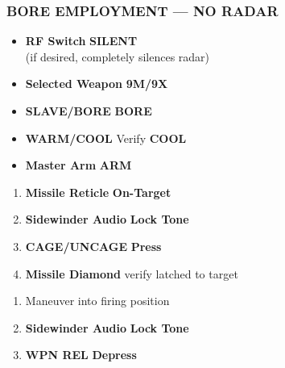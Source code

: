 \subsubsection{BORE EMPLOYMENT --- NO RADAR}
\label{subsec:aim9:bore}
\begin{checklistenumerate}
    \blueitem[Prerequisites]
    \begin{itemize}
        \item \textbf{RF Switch} \dotfill \textbf{SILENT} \\
        \hfill (if desired, completely silences radar)
        \item \textbf{Selected Weapon} \dotfill \textbf{9M/9X}
        \item \textbf{SLAVE/BORE} \dotfill \textbf{BORE}
        \item \textbf{WARM/COOL} \dotfill Verify \textbf{COOL}
        \item \textbf{Master Arm} \dotfill \textbf{ARM}
    \end{itemize}
    \begin{enumerate}
        \item \textbf{Missile Reticle} \dotfill \textbf{On-Target}
        \item \textbf{Sidewinder Audio} \dotfill \textbf{Lock Tone}
        \item \textbf{CAGE/UNCAGE} \dotfill \textbf{Press}
        \item \textbf{Missile Diamond} \dotfill verify latched to target
    \end{enumerate}
    \begin{enumerate}
        \item Maneuver into firing position
        \item \textbf{Sidewinder Audio} \dotfill \textbf{Lock Tone}
        \item \textbf{WPN REL} \dotfill \textbf{Depress}
    \end{enumerate}
\end{checklistenumerate}

